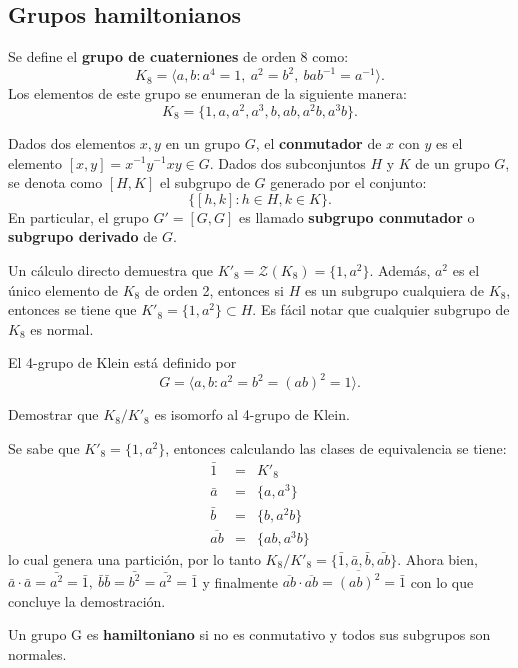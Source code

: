 \subsection{Grupos hamiltonianos}
Se define el \textbf{grupo de cuaterniones} de orden 8 como:\[ K_8 =  \langle a,b \colon a^4 =1, \ a^2 = b ^2, \ bab^{-1} = a^{-1} \rangle.  \]
Los elementos de este grupo se enumeran de la siguiente manera:
\[ K_8 = \{ 1,a,a^2, a^3, b, ab, a^2b, a^3b \}. \]
\begin{definicion}
Dados dos elementos $x,y$ en un grupo $G$, el \textbf{conmutador} de $x$ con $y$ es el elemento $[x,y] = x^{-1}y^{-1}xy \in G$. Dados dos subconjuntos $H$ y $K$ de un grupo $G$, se denota como $[H,K]$ el subgrupo de $G$ generado por el conjunto:
\[\{[h,k] \colon h \in H, k \in K\}. \]
En particular, el grupo $G'=[G,G]$ es llamado \textbf{subgrupo conmutador} o \textbf{subgrupo derivado} de $G$.
\end{definicion}
Un cálculo directo demuestra que $K'_8 = \mathcal{Z}(K_8) = \{1, a^2\}$. Además, $a^2$ es el único elemento de $K_8$ de orden 2, entonces si $H$ es un subgrupo cualquiera de $K_8$, entonces se tiene que $K'_8 = \{1,a^2\} \subset H$. Es fácil notar que cualquier subgrupo de $K_8$ es normal.
\begin{definicion}
El 4-grupo de Klein está definido por
\[ G = \langle a, b \colon a^2 = b^2 = (ab)^2 = 1 \rangle. \] 
\end{definicion}
\begin{ejercicio}\label{ejer:klein}
Demostrar que $K_8/K'_8$ es isomorfo al 4-grupo de Klein.
\end{ejercicio} 
\begin{solucion}
Se sabe que $K'_8 = \{1,a^2\}$, entonces calculando las clases de equivalencia se tiene:
\begin{eqnarray*}
\bar{1} &=& K'_8\\
\bar{a} &=& \{a, a^3\} \\
\bar{b} &=&  \{b, a^2b \} \\
\overline{ab} &=& \{ ab, a^3b \}
\end{eqnarray*}
lo cual genera una partición, por lo tanto $K_8/K'_8 = \{\bar{1},\bar{a},\bar{b}, \bar{ab}  \}$. Ahora bien, $\bar{a}\cdot\bar{a} =\bar{a^2}=\bar{1}, \ \bar{b}\bar{b} = \bar{b^2} = \bar{a^2} = \bar{1}$ y finalmente $\overline{ab}\cdot\overline{ab} = \overline{(ab)^2} = \bar{1}$ con lo que concluye la demostración. \qedsymbol
\end{solucion}
\begin{definicion}
Un grupo G es  \textbf{hamiltoniano} si no es conmutativo y todos sus subgrupos son normales. 
\end{definicion}
